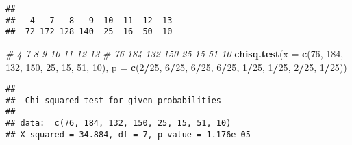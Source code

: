 \documentclass[]{article}
\newenvironment{Shaded}{\begin{snugshade}}{\end{snugshade}}
\newcommand{\CommentTok}[1]{\textcolor[rgb]{0.56,0.35,0.01}{\textit{#1}}}
\newcommand{\DataTypeTok}[1]{\textcolor[rgb]{0.13,0.29,0.53}{#1}}
\newcommand{\DecValTok}[1]{\textcolor[rgb]{0.00,0.00,0.81}{#1}}
\newcommand{\KeywordTok}[1]{\textcolor[rgb]{0.13,0.29,0.53}{\textbf{#1}}}
\newcommand{\NormalTok}[1]{#1}
\newcommand{\OperatorTok}[1]{\textcolor[rgb]{0.81,0.36,0.00}{\textbf{#1}}}
\newcommand{\StringTok}[1]{\textcolor[rgb]{0.31,0.60,0.02}{#1}}
\begin{document}
\begin{Shaded}
\end{Shaded}

\begin{verbatim}
## 
##   4   7   8   9  10  11  12  13 
##  72 172 128 140  25  16  50  10
\end{verbatim}

\begin{Shaded}
\begin{Highlighting}[]
\CommentTok{#  4   7   8   9  10  11  12  13}
\CommentTok{# 76 184 132 150  25  15  51  10}
\KeywordTok{chisq.test}\NormalTok{(}\DataTypeTok{x =} \KeywordTok{c}\NormalTok{(}\DecValTok{76}\NormalTok{, }\DecValTok{184}\NormalTok{, }\DecValTok{132}\NormalTok{, }\DecValTok{150}\NormalTok{, }\DecValTok{25}\NormalTok{, }\DecValTok{15}\NormalTok{, }\DecValTok{51}\NormalTok{, }\DecValTok{10}\NormalTok{), }\DataTypeTok{p =} \KeywordTok{c}\NormalTok{(}\DecValTok{2}\OperatorTok{/}\DecValTok{25}\NormalTok{, }\DecValTok{6}\OperatorTok{/}\DecValTok{25}\NormalTok{, }\DecValTok{6}\OperatorTok{/}\DecValTok{25}\NormalTok{, }\DecValTok{6}\OperatorTok{/}\DecValTok{25}\NormalTok{, }\DecValTok{1}\OperatorTok{/}\DecValTok{25}\NormalTok{, }\DecValTok{1}\OperatorTok{/}\DecValTok{25}\NormalTok{, }\DecValTok{2}\OperatorTok{/}\DecValTok{25}\NormalTok{, }\DecValTok{1}\OperatorTok{/}\DecValTok{25}\NormalTok{))}
\end{Highlighting}
\end{Shaded}

\begin{verbatim}
## 
##  Chi-squared test for given probabilities
## 
## data:  c(76, 184, 132, 150, 25, 15, 51, 10)
## X-squared = 34.884, df = 7, p-value = 1.176e-05
\end{verbatim}
\end{document}
